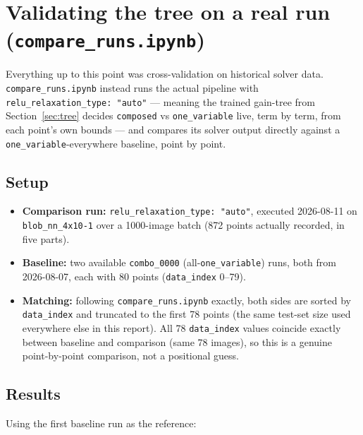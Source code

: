 \documentclass[11pt,a4paper]{article}
\begin{document}
\section{Validating the tree on a real run (\texttt{compare\_runs.ipynb})}
\label{sec:comparerun}
Everything up to this point was cross-validation on historical solver data. \texttt{compare\_runs.ipynb} instead runs the actual pipeline with \texttt{relu\_relaxation\_type: "auto"} --- meaning the trained gain-tree from Section~\ref{sec:tree} decides \texttt{composed} vs \texttt{one\_variable} live, term by term, from each point's own bounds --- and compares its solver output directly against a \texttt{one\_variable}-everywhere baseline, point by point.

\subsection{Setup}
\begin{itemize}
  \item \textbf{Comparison run:} \texttt{relu\_relaxation\_type: "auto"}, executed 2026-08-11 on \texttt{blob\_nn\_4x10-1} over a 1000-image batch (872 points actually recorded, in five parts).
  \item \textbf{Baseline:} two available \texttt{combo\_0000} (all-\texttt{one\_variable}) runs, both from 2026-08-07, each with 80 points (\texttt{data\_index} 0--79).
  \item \textbf{Matching:} following \texttt{compare\_runs.ipynb} exactly, both sides are sorted by \texttt{data\_index} and truncated to the first 78 points (the same test-set size used everywhere else in this report). All 78 \texttt{data\_index} values coincide exactly between baseline and comparison (same 78 images), so this is a genuine point-by-point comparison, not a positional guess.
\end{itemize}

\subsection{Results}
Using the first baseline run as the reference:
\end{document}
